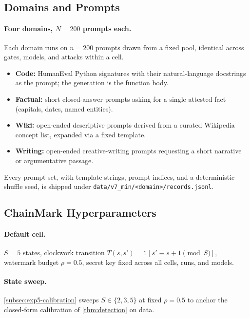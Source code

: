 \subsection{Domains and Prompts}

\paragraph{Four domains, $N = 200$ prompts each.} Each domain runs
on $n = 200$ prompts drawn from a fixed pool, identical across
gates, models, and attacks within a cell.
\begin{itemize}[leftmargin=1.2em, itemsep=1pt, topsep=2pt]
  \item \textbf{Code:} HumanEval Python signatures with their
    natural-language docstrings as the prompt; the generation is
    the function body.
  \item \textbf{Factual:} short closed-answer prompts asking for
    a single attested fact (capitals, dates, named entities).
  \item \textbf{Wiki:} open-ended descriptive prompts derived from
    a curated Wikipedia concept list, expanded via a fixed
    template.
  \item \textbf{Writing:} open-ended creative-writing prompts
    requesting a short narrative or argumentative passage.
\end{itemize}
Every prompt set, with template strings, prompt indices, and a
deterministic shuffle seed, is shipped under
\texttt{data/v7\_min/<domain>/records.jsonl}.

\subsection{ChainMark Hyperparameters}

\paragraph{Default cell.} $S = 5$ states, clockwork transition
$T(s, s') = \mathbb{1}[s' \equiv s{+}1 \pmod{S}]$, watermark budget
$\rho = 0.5$, secret key fixed across all cells, runs, and models.

\paragraph{State sweep.} \autoref{subsec:exp5-calibration} sweeps
$S \in \{2, 3, 5\}$ at fixed $\rho = 0.5$ to anchor the
closed-form calibration of \autoref{thm:detection} on data.


